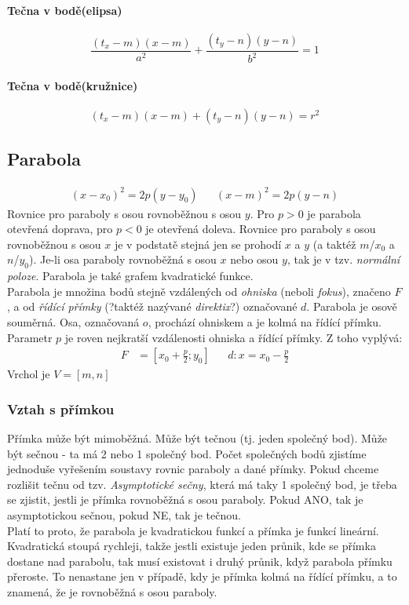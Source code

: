 \documentclass[12pt]{article}
\begin{document}
\paragraph{Tečna v bodě(elipsa)}
\begin{equation}
\frac{(t_x-m)(x-m)}{a^2} + \frac{(t_y-n)(y-n)}{b^2} = 1
\end{equation}
\paragraph{Tečna v bodě(kružnice)}
\begin{equation}
(t_x -m)(x-m) + (t_y -n)(y-n) = r^2
\end{equation}


\subsection{Parabola}
\begin{align}
(x-x_0)^2 = 2p(y-y_0) && (x-m)^2 = 2p(y-n)
\end{align}
Rovnice pro paraboly s osou rovnoběžnou s osou $y$. Pro $p>0$ je parabola otevřená doprava, pro $p<0$ je otevřená doleva. Rovnice pro paraboly s osou rovnoběžnou s osou $x$ je v podstatě stejná jen se prohodí $x$ a $y$ (a taktéž $m$/$x_0$ a $n$/$y_0$). Je-li osa paraboly rovnoběžná s osou $x$ nebo osou $y$, tak je v tzv. \emph{normální poloze}. Parabola je také grafem kvadratické funkce.\\
Parabola je množina bodů stejně vzdálených od \emph{ohniska} (neboli \emph{fokus}), značeno $F$, a od \emph{řídící přímky} (?taktéž nazývané \emph{direktix}?) označované $d$. Parabola je osově souměrná. Osa, označovaná $o$, prochází ohniskem a je kolmá na řídící přímku. Parametr $p$ je roven nejkratší vzdálenosti ohniska a řídící přímky. Z toho vyplývá:
\begin{align}
F &= \left[ x_0 + \frac{p}{2} ; y_0 \right] && d: x = x_0 - \frac{p}{2}
\end{align}
Vrchol je $ V = \left[ m,n \right]$
\subsubsection{Vztah s přímkou}
Přímka může být mimoběžná. Může být tečnou (tj. jeden společný bod). Může být sečnou - ta má 2 nebo 1 společný bod. Počet společných bodů zjistíme jednoduše vyřešením soustavy rovnic paraboly a dané přímky. Pokud chceme rozlišit tečnu od tzv. \emph{Asymptotické sečny}, která má taky 1 společný bod, je třeba se zjistit, jestli je přímka rovnoběžná s osou paraboly. Pokud ANO, tak je asymptotickou sečnou, pokud NE, tak je tečnou.\\
Platí to proto, že parabola je kvadratickou funkcí a přímka je funkcí lineární. Kvadratická stoupá rychleji, takže jestli existuje jeden průnik, kde se přímka dostane nad parabolu, tak musí existovat i druhý průnik, když parabola přímku přeroste. To nenastane jen v případě, kdy je přímka kolmá na řídící přímku, a to znamená, že je rovnoběžná s osou paraboly.
\end{document}
